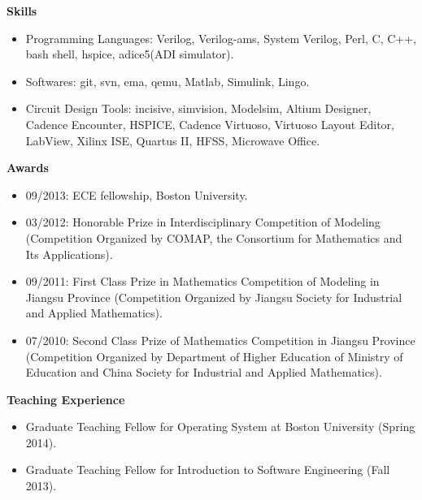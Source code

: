 \documentclass[]{article}
\begin{document}
\noindent \textbf{Skills}
\begin{itemize}
\item Programming Languages:  Verilog, Verilog-ams, System Verilog, Perl, C,
C++, bash shell, hspice, adice5(ADI simulator).
\item Softwares:  git, svn, ema, qemu, Matlab, Simulink, Lingo.
\item Circuit Design Tools:  incisive, simvision, Modelsim, Altium Designer,
Cadence Encounter, HSPICE, Cadence Virtuoso, Virtuoso Layout Editor, LabView,
Xilinx ISE, Quartus II, HFSS, Microwave Office. 

\end{itemize}
\noindent \textbf{Awards}
\begin{itemize}
\item 09/2013:  ECE fellowship, Boston University.

\item 03/2012:  Honorable Prize in Interdisciplinary Competition of Modeling
(Competition Organized by COMAP, the Consortium for Mathematics and Its
Applications).

\item 09/2011:  First Class Prize in Mathematics Competition of Modeling in
Jiangsu Province (Competition Organized by Jiangsu Society for Industrial and
Applied Mathematics).

\item 07/2010:  Second Class Prize of Mathematics Competition in Jiangsu
Province (Competition Organized by Department of Higher Education of Ministry
of Education and China Society for Industrial and Applied Mathematics).

\end{itemize}

\noindent \textbf{Teaching Experience}
\begin{itemize}
\item Graduate Teaching Fellow for Operating System at Boston University
(Spring 2014).
\item Graduate Teaching Fellow for Introduction to Software Engineering (Fall
2013).
\end{itemize}
\end{document}

